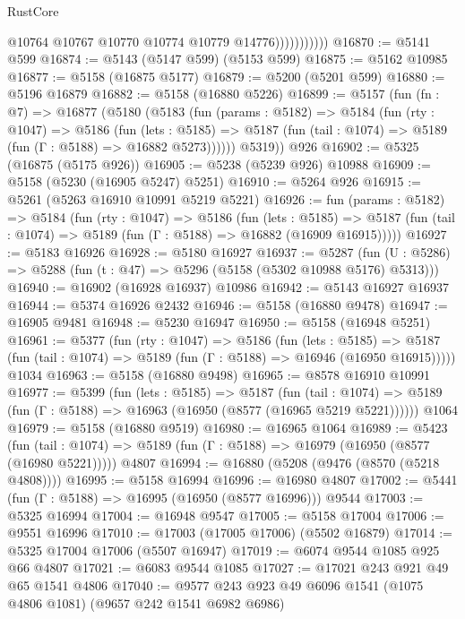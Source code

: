 \begin{lexlean}{RustCore}
\begin{coremodule}
                          @10764
                          @10767
                          @10770
                          @10774
                          @10779
                          @14776)))))))))))
@16870 := @5141 @599
@16874 := @5143 (@5147 @599) (@5153 @599)
@16875 := @5162 @10985
@16877 := @5158 (@16875 @5177)
@16879 := @5200 (@5201 @599)
@16880 := @5196 @16879
@16882 := @5158 (@16880 @5226)
@16899 := @5157
    (fun (fn : @7) =>
    @16877
      (@5180
        (@5183
          (fun (params : @5182) =>
          @5184
            (fun (rty : @1047) =>
            @5186
              (fun (lets : @5185) =>
              @5187 (fun (tail : @1074) => @5189 (fun (Γ : @5188) => @16882 @5273))))))
        @5319))
    @926
@16902 := @5325 (@16875 (@5175 @926))
@16905 := @5238 (@5239 @926) @10988
@16909 := @5158 (@5230 (@16905 @5247) @5251)
@16910 := @5264 @926
@16915 := @5261 (@5263 @16910 @10991 @5219 @5221)
@16926 := fun (params : @5182) =>
  @5184
    (fun (rty : @1047) =>
    @5186
      (fun (lets : @5185) =>
      @5187 (fun (tail : @1074) => @5189 (fun (Γ : @5188) => @16882 (@16909 @16915)))))
@16927 := @5183 @16926
@16928 := @5180 @16927
@16937 := @5287
    (fun (U : @5286) => @5288 (fun (t : @47) => @5296 (@5158 (@5302 @10988 @5176) @5313)))
@16940 := @16902 (@16928 @16937) @10986
@16942 := @5143 @16927 @16937
@16944 := @5374 @16926 @2432
@16946 := @5158 (@16880 @9478)
@16947 := @16905 @9481
@16948 := @5230 @16947
@16950 := @5158 (@16948 @5251)
@16961 := @5377
    (fun (rty : @1047) =>
    @5186
      (fun (lets : @5185) =>
      @5187 (fun (tail : @1074) => @5189 (fun (Γ : @5188) => @16946 (@16950 @16915)))))
    @1034
@16963 := @5158 (@16880 @9498)
@16965 := @8578 @16910 @10991
@16977 := @5399
    (fun (lets : @5185) =>
    @5187
      (fun (tail : @1074) =>
      @5189 (fun (Γ : @5188) => @16963 (@16950 (@8577 (@16965 @5219 @5221))))))
    @1064
@16979 := @5158 (@16880 @9519)
@16980 := @16965 @1064
@16989 := @5423
    (fun (tail : @1074) => @5189 (fun (Γ : @5188) => @16979 (@16950 (@8577 (@16980 @5221)))))
    @4807
@16994 := @16880 (@5208 (@9476 (@8570 (@5218 @4808))))
@16995 := @5158 @16994
@16996 := @16980 @4807
@17002 := @5441 (fun (Γ : @5188) => @16995 (@16950 (@8577 @16996))) @9544
@17003 := @5325 @16994
@17004 := @16948 @9547
@17005 := @5158 @17004
@17006 := @9551 @16996
@17010 := @17003 (@17005 @17006) (@5502 @16879)
@17014 := @5325 @17004 @17006 (@5507 @16947)
@17019 := @6074 @9544 @1085 @925 @66 @4807
@17021 := @6083 @9544 @1085
@17027 := @17021 @243 @921 @49 @65 @1541 @4806
@17040 := @9577 @243 @923 @49 @6096 @1541 (@1075 @4806 @1081) (@9657 @242 @1541 @6982 @6986)

\end{coremodule}
\end{lexlean}
